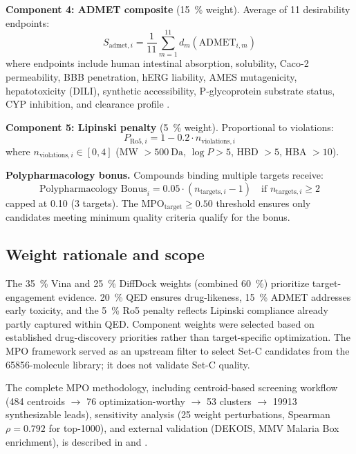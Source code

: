 \documentclass[journal=jcisd8,manuscript=suppinfo]{achemso}
\begin{document}
\textbf{Component 4: ADMET composite} (\qty{15}{\percent} weight). Average of 11 desirability endpoints:
\begin{equation}
S_{\text{admet}, i} = \frac{1}{11} \sum_{m=1}^{11} d_m(\text{ADMET}_{i,m})
\label{eq:sm_admet}
\end{equation}
where endpoints include human intestinal absorption, solubility, Caco-2 permeability, BBB penetration, hERG liability, AMES mutagenicity, hepatotoxicity (DILI), synthetic accessibility, P-glycoprotein substrate status, CYP inhibition, and clearance profile \cite{Swanson2024}.

\textbf{Component 5: Lipinski penalty} (\qty{5}{\percent} weight). Proportional to violations:
\begin{equation}
P_{\text{Ro5}, i} = 1 - 0.2 \cdot n_{\text{violations}, i}
\label{eq:sm_ro5}
\end{equation}
where $n_{\text{violations}, i} \in [0,4]$ (MW $> \qty{500}{\dalton}$, $\log P > \num{5}$, HBD $> \num{5}$, HBA $> \num{10}$).

\textbf{Polypharmacology bonus.} Compounds binding multiple targets receive:
\begin{equation}
\text{Polypharmacology Bonus}_i = 0.05 \cdot (n_{\text{targets}, i} - 1) \quad \text{if } n_{\text{targets}, i} \geq 2
\label{eq:sm_poly}
\end{equation}
capped at \num{+0.10} (3 targets). The $\text{MPO}_{\text{target}} \geq \num{0.50}$ threshold ensures only candidates meeting minimum quality criteria qualify for the bonus.

\subsection{Weight rationale and scope}\label{sec:sm_mpo_weights}
The \qty{35}{\percent} Vina and \qty{25}{\percent} DiffDock weights (combined \qty{60}{\percent}) prioritize target-engagement evidence. \qty{20}{\percent} QED ensures drug-likeness, \qty{15}{\percent} ADMET addresses early toxicity, and the \qty{5}{\percent} Ro5 penalty reflects Lipinski compliance already partly captured within QED. Component weights were selected based on established drug-discovery priorities \cite{Hughes2008,Gleeson2008,Lipinski2004} rather than target-specific optimization. The MPO framework served as an upstream filter to select Set-C candidates from the \num{65856}-molecule library; it does not validate Set-C quality.

The complete MPO methodology, including centroid-based screening workflow (\num{484} centroids $\rightarrow$ \num{76} optimization-worthy $\rightarrow$ \num{53} clusters $\rightarrow$ \num{19913} synthesizable leads), sensitivity analysis (\num{25} weight perturbations, Spearman $\rho = \num{0.792}$ for top-1000), and external validation (DEKOIS, MMV Malaria Box enrichment), is described in  and .
\end{document}
